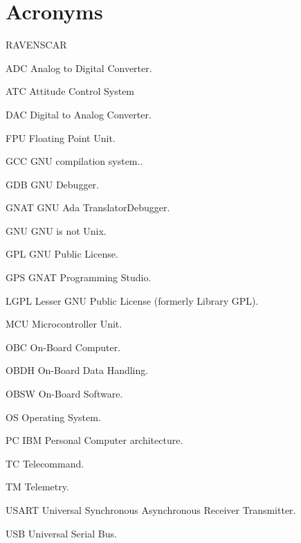 \section*{Acronyms}

\begin{entry}{RAVENSCAR}
\item[ADC] Analog to Digital Converter.
\item[ATC] Attitude Control System
\item[DAC] Digital to Analog Converter.
\item[FPU] Floating Point Unit.
\item[GCC] GNU compilation system..
\item[GDB] GNU Debugger.
\item[GNAT] GNU Ada TranslatorDebugger.
\item[GNU] GNU is not Unix.
\item[GPL] GNU Public License.
\item[GPS] GNAT Programming Studio.
\item[LGPL] Lesser GNU Public License (formerly Library GPL).
\item[MCU] Microcontroller Unit.
\item[OBC] On-Board Computer.
\item[OBDH] On-Board Data Handling.
\item[OBSW] On-Board Software.
\item[OS] Operating System.
\item[PC] IBM Personal Computer architecture.
\item[TC] Telecommand.
\item[TM] Telemetry.
\item[USART] Universal Synchronous Asynchronous Receiver Transmitter.
\item[USB] Universal Serial Bus.
\end{entry}

